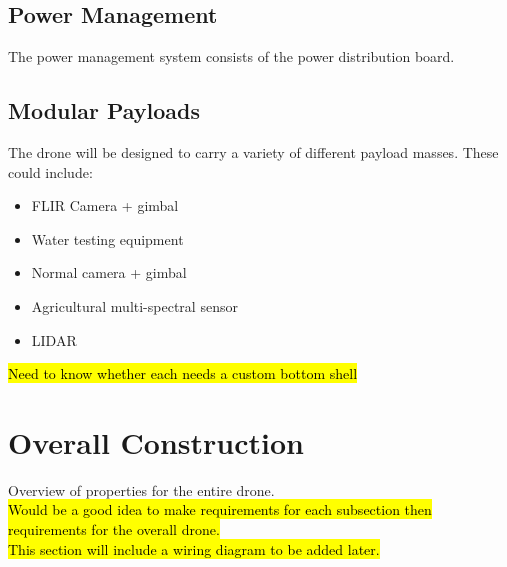 \subsection{Power Management}
The power management system consists of the power distribution board.

\subsection{Modular Payloads}
\noindent
The drone will be designed to carry a variety of different payload masses. These could include:
\begin{itemize}
	\setlength{\itemsep}{0pt}%
	\setlength{\parskip}{-6pt}%
	\item FLIR Camera + gimbal
	\item Water testing equipment
	\item Normal camera + gimbal
	\item Agricultural multi-spectral sensor
	\item LIDAR
\end{itemize}
\hl{Need to know whether each needs a custom bottom shell}

\section{Overall Construction}
Overview of properties for the entire drone. \\

\hl{Would be a good idea to make requirements for each subsection then requirements for the overall drone.}\\

\hl{This section will include a wiring diagram to be added later.}\\